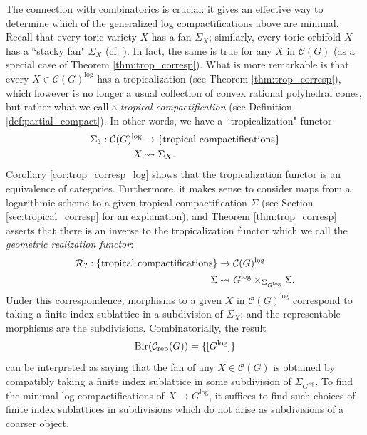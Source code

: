\documentclass[11pt]{amsart}
\theoremstyle{definition}
\theoremstyle{remark}
\def\log{\mathrm{log}}
\begin{document}
The connection with combinatorics is crucial: it
gives an effective way to determine which of the generalized log compactifications above are minimal.
Recall that every toric variety $X$ has a fan $\Sigma_X$; similarly,
every toric orbifold $X$ has a ``stacky fan" $\Sigma_X$ (cf.
\cite{Borisov_2004,fantechi2009smoothtoricdmstacks,Geraschenko_2014,ATheoryOfStaGillam2015}). In fact, the same is true
for any $X$ in $\mathcal{C}(G)$ (as a special case of Theorem \ref{thm:trop_corresp}). What is more remarkable is that
every $X \in \mathcal{C}(G)^{\log}$ has a tropicalization (see Theorem \ref{thm:trop_corresp}), which however is no
longer a usual collection of convex rational polyhedral cones, but rather what
we call a \emph{tropical compactification} (see Definition \ref{def:partial_compact}). In other words, we have a ``tropicalization" functor
\begin{align*}
	\Sigma_?:\mathcal{C}(G)^{\log} &\to \{ \textup{tropical compactifications} \}\\
	X &\rightsquigarrow \Sigma_X.
\end{align*}
Corollary \ref{cor:trop_corresp_log} shows that the tropicalization functor is an equivalence of categories.
Furthermore, it makes sense to consider maps from a logarithmic scheme to a given tropical compactification $\Sigma$ (see Section \ref{sec:tropical_corresp} for an explanation), and Theorem \ref{thm:trop_corresp} asserts that there is an inverse to the tropicalization functor which we call the \emph{geometric realization functor}:
\begin{align*}
	\mathcal{R}_?:\{\textup{tropical compactifications}\} &\to \mathcal{C}(G)^{\log} \\
	\Sigma &\rightsquigarrow G^{\log} \times_{\Sigma_{G^{\log}}} \Sigma.
\end{align*}
Under this correspondence, morphisms to a given $X$ in $\mathcal{C}(G)^{\log}$ correspond to taking a finite index sublattice in a subdivision of $\Sigma_X$; and the representable morphisms are the subdivisions. Combinatorially, the result
\[
\textup{Bir}(\mathcal{C}_{\textup{rep}}(G))=\{[G^{\log}]\}
\]
can be interpreted as saying that the fan of any $X \in \mathcal{C}(G)$ is obtained by compatibly taking a finite index sublattice in some subdivision of $\Sigma_{G^{\log}}$. To find the minimal log compactifications of $X \to G^{\log}$, it suffices to find such choices of finite index sublattices in subdivisions which do not arise as subdivisions of a coarser object.
\end{document}
